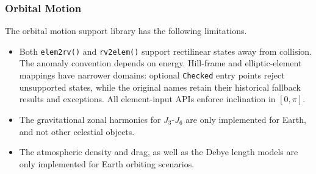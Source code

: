 \subsubsection{Orbital Motion}
The orbital motion support library has the following limitations.
\begin{itemize}
	\item Both {\tt elem2rv()} and {\tt rv2elem()} support rectilinear states away from collision. The anomaly convention depends on energy. Hill-frame and elliptic-element mappings have narrower domains: optional {\tt *Checked} entry points reject unsupported states, while the original names retain their historical fallback results and exceptions. All element-input APIs enforce inclination in $[0,\pi]$.
	\item The gravitational zonal harmonics for $J_{3}$-$J_{6}$ are only implemented for Earth, and not other celestial objects.
	\item The atmospheric density and drag, as well as the Debye length models are only implemented for Earth orbiting scenarios.
\end{itemize}
